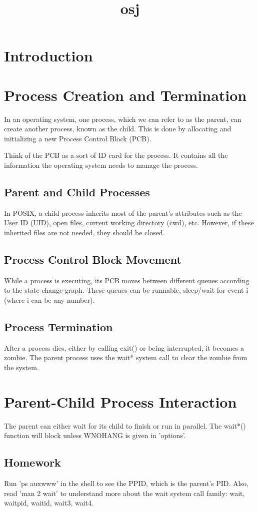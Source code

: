 \documentclass[12pt]{report}
\title{osj}
\author{}
\begin{document}
\maketitle
\tableofcontents
\newpage

\section{Introduction}
\section{Process Creation and Termination}In an operating system, one process, which we can refer to as the parent, can create another process, known as the child. This is done by allocating and initializing a new Process Control Block (PCB). \begin{tcolorbox}[  colback=blue!10,  colframe=blue,  title={\fontfamily{lmr}\selectfont \faComment\ Simple Explanation},  fonttitle=\bfseries,  fontupper=\fontfamily{lmr}\selectfont,  boxrule=1pt,  sharp corners,]Think of the PCB as a sort of ID card for the process. It contains all the information the operating system needs to manage the process.\end{tcolorbox}\subsection{Parent and Child Processes}In POSIX, a child process inherits most of the parent's attributes such as the User ID (UID), open files, current working directory (cwd), etc. However, if these inherited files are not needed, they should be closed. \subsection{Process Control Block Movement}While a process is executing, its PCB moves between different queues according to the state change graph. These queues can be runnable, sleep/wait for event i (where i can be any number).\subsection{Process Termination}After a process dies, either by calling exit() or being interrupted, it becomes a zombie. The parent process uses the wait* system call to clear the zombie from the system. \section{Parent-Child Process Interaction}The parent can either wait for its child to finish or run in parallel. The wait*() function will block unless WNOHANG is given in 'options'.\subsection{Homework}Run 'ps auxwww' in the shell to see the PPID, which is the parent's PID. Also, read 'man 2 wait' to understand more about the wait system call family: wait, waitpid, waitid, wait3, wait4.
\end{document}
